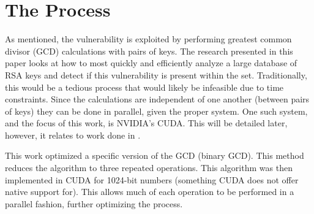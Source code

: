 \documentclass[12pt]{ucthesis}
\begin{document}
\section{The Process}
\label{sec:proc}
As mentioned, the vulnerability is exploited by performing greatest common
divisor (GCD) calculations with pairs of keys. The research presented in this
paper looks at how to most quickly and efficiently analyze a large database of
RSA keys and detect if this vulnerability is present within the set.
Traditionally, this would be a tedious process that would likely be infeasible
due to time constraints. Since the calculations are independent of one another
(between pairs of keys) they can be done in parallel, given the proper system.
One such system, and the focus of this work, is NVIDIA's CUDA. This will be
detailed later, however, it relates to work done in \cite{fujimoto2009high}. 

This work optimized a specific version of the GCD (binary GCD). This method
reduces the algorithm to three repeated operations. This algorithm was then
implemented in CUDA for 1024-bit numbers (something CUDA does not offer native
support for). This allows much of each operation to be performed in a parallel
fashion, further optimizing the process.

%
%
%
\end{document}
